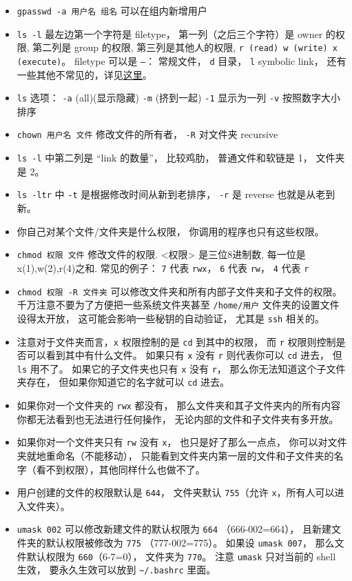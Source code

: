 \begin{itemize}
\item \verb`gpasswd -a 用户名 组名` 可以在组内新增用户
\item \verb`ls -l` 最左边第一个字符是 filetype， 第一列（之后三个字符）是 owner 的权限, 第二列是 group 的权限, 第三列是其他人的权限, \verb`r (read) w (write) x (execute)`。 filetype 可以是 \verb`–`： 常规文件， \verb`d` 目录， \verb`l` symbolic link， 还有一些其他不常见的，详见\href{https://linuxconfig.org/identifying-file-types-in-linux}{这里}。
\item \verb`ls` 选项： \verb`-a` (all)(显示隐藏) \verb`-m` (挤到一起) \verb`-1` 显示为一列 \verb`-v` 按照数字大小排序
\item \verb`chown 用户名 文件` 修改文件的所有者， \verb`-R` 对文件夹 recursive
\item \verb`ls -l` 中第二列是 “link 的数量”， 比较鸡肋， 普通文件和软链是 1， 文件夹是 2。
\item \verb`ls -ltr` 中 \verb`-t` 是根据修改时间从新到老排序， \verb`-r` 是 reverse 也就是从老到新。
\item 你自己对某个文件/文件夹是什么权限， 你调用的程序也只有这些权限。
\item \verb`chmod 权限 文件` 修改文件的权限. <权限> 是三位8进制数, 每一位是 x(1),w(2),r(4)之和. 常见的例子： \verb`7` 代表 \verb`rwx`， \verb`6` 代表 \verb`rw`， \verb`4` 代表 \verb`r`
\item \verb`chmod 权限 -R 文件夹` 可以修改文件夹和所有内部子文件夹和子文件的权限。 千万注意不要为了方便把一些系统文件夹甚至 \verb`/home/用户` 文件夹的设置文件设得太开放， 这可能会影响一些秘钥的自动验证， 尤其是 \verb`ssh` 相关的。
\item 注意对于文件夹而言，\verb`x` 权限控制的是 \verb`cd` 到其中的权限， 而 \verb`r` 权限则控制是否可以看到其中有什么文件。 如果只有 \verb`x` 没有 \verb`r` 则代表你可以 \verb`cd` 进去， 但 \verb`ls` 用不了。 如果它的子文件夹也只有 \verb`x` 没有 \verb`r`， 那么你无法知道这个子文件夹存在， 但如果你知道它的名字就可以 \verb`cd` 进去。
\item 如果你对一个文件夹的 \verb`rwx` 都没有， 那么文件夹和其子文件夹内的所有内容你都无法看到也无法进行任何操作， 无论内部的文件和子文件夹有多开放。
\item 如果你对一个文件夹只有 \verb`rw` 没有 \verb`x`， 也只是好了那么一点点， 你可以对文件夹就地重命名（不能移动）， 只能看到文件夹内第一层的文件和子文件夹的名字（看不到权限），其他同样什么也做不了。
\item 用户创建的文件的权限默认是 \verb`644`， 文件夹默认 \verb`755`（允许 \verb`x`，所有人可以进入文件夹）。
\item \verb`umask 002` 可以修改新建文件的默认权限为 \verb`664` （666-002=664）， 且新建文件夹的默认权限被修改为 \verb`775` （777-002=775）。 如果设 \verb`umask 007`， 那么文件默认权限为 \verb`660`（6-7=0）， 文件夹为 \verb`770`。 注意 \verb`umask` 只对当前的 shell 生效， 要永久生效可以放到 \verb`~/.bashrc` 里面。

\end{itemize}
